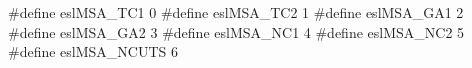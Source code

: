 \begin{cchunk}
#define eslMSA_TC1     0
#define eslMSA_TC2     1
#define eslMSA_GA1     2
#define eslMSA_GA2     3
#define eslMSA_NC1     4
#define eslMSA_NC2     5
#define eslMSA_NCUTS   6
\end{cchunk}
